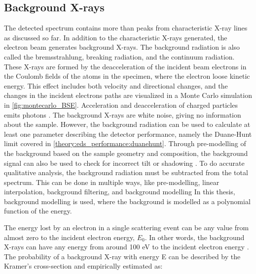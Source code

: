 \subsection{Background X-rays}
\label{theory:xray_formation:background}


The detected spectrum contains more than peaks from characteristic X-ray lines as discussed so far.
In addition to the characteristic X-rays generated, the electron beam generates background X-rays.
The background radiation is also called the bremsstrahlung, breaking radiation, and the continuum radiation.
These X-rays are formed by the deacceleration of the incident beam electrons in the Coulomb fields of the atoms in the specimen, where the electron loose kinetic energy.
This effect includes both velocity and directional changes, and the changes in the incident electrons paths are visualized in a Monte Carlo simulation in \cref{fig:montecarlo_BSE}.
Acceleration and deacceleration of charged particles emits photons \cite{notaros_electromagnetics_2010}.
The background X-rays are white noise, giving no information about the sample.
However, the background radiation can be used to calculate at least one parameter describing the detector performance, namely the Duane-Hunt limit covered in \cref{theory:eds_performance:duanehunt}.
Through pre-modelling of the background based on the sample geometry and composition, the background signal can also be used to check for incorrect tilt or shadowing \cite{edax_insight_2019}.
To do accurate qualitative analysis, the background radiation must be subtracted from the total spectrum.
This can be done in multiple ways, like pre-modelling, linear interpolation, background filtering, and background modelling \cite{liao2006practical}
In this thesis, background modelling is used, where the background is modelled as a polynomial function of the energy.


The energy lost by an electron in a single scattering event can be any value from almost zero to the incident electron energy, $E_0$.
In other words, the background X-rays can have any energy from around 100 eV to the incident electron energy \cite[Ch. 4.3]{goldstein_scanning_2018}.
The probability of a background X-ray with energy E can be described by the Kramer's cross-section and empirically estimated as:

